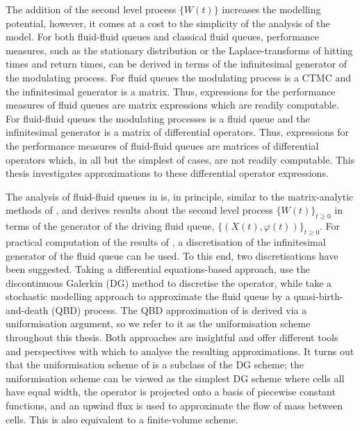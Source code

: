 The addition of the second level process \(\{W(t)\}\) increases the modelling potential, however, it comes at a cost to the simplicity of the analysis of the model. For both fluid-fluid queues and classical fluid queues, performance measures, such as the stationary distribution or the Laplace-transforms of hitting times and return times, can be derived in terms of the infinitesimal generator of the modulating process. For fluid queues the modulating process is a CTMC and the infinitesimal generator is a matrix. Thus, expressions for the performance measures of fluid queues are matrix expressions which are readily computable. For fluid-fluid queues the modulating processes is a fluid queue and the infinitesimal generator is a matrix of differential operators. Thus, expressions for the performance measures of fluid-fluid queues are matrices of differential operators which, in all but the simplest of cases, are not readily computable. This thesis investigates approximations to these differential operator expressions. 

The analysis of fluid-fluid queues in \cite{bo2014} is, in principle, similar to the matrix-analytic methods of \cite{bean2005}, and derives results about the second level process \(\{W(t)\}_{t\geq0}\) in terms of the generator of the driving fluid queue, \(\{(X(t),\varphi(t))\}_{t\geq0}\). For practical computation of the results of \cite{bo2014}, a discretisation of the infinitesimal generator of the fluid queue can be used. To this end, two discretisations have been suggested. Taking a differential equations-based approach, \cite{blnos2022} use the discontinuous Galerkin (DG) method to discretise the operator, while \cite{bo2013} take a stochastic modelling approach to approximate the fluid queue by a quasi-birth-and-death (QBD) process. The QBD approximation of \cite{bo2013} is derived via a uniformisation argument, so we refer to it as the uniformisation scheme throughout this thesis. Both approaches are insightful and offer different tools and perspectives with which to analyse the resulting approximations. It turns out that the uniformisation scheme of \cite{bo2013} is a subclass of the DG scheme; the uniformisation scheme can be viewed as the simplest DG scheme where cells all have equal width, the operator is projected onto a basis of piecewise constant functions, and an upwind flux is used to approximate the flow of mass between cells. This is also equivalent to a finite-volume scheme.


